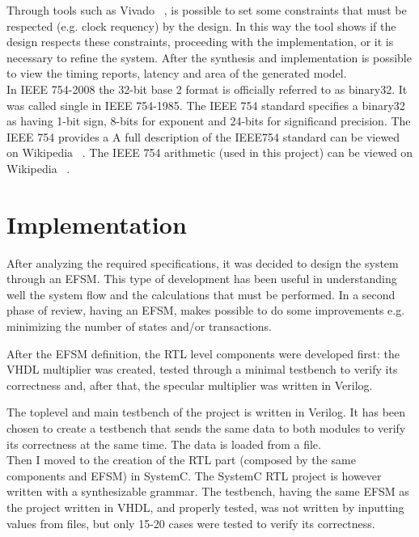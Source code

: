 \documentclass[]{IEEEtran}
\begin{document}
	Through tools such as Vivado ~\cite{vivado}, is possible to set some constraints that must be respected (e.g. clock requency) by the design. In this way the tool shows if the design respects these constraints, proceeding with the implementation, or it is necessary to refine the system.
	After the synthesis and implementation is possible to view the timing reports, latency and area of the generated model.
	\\
	
	In IEEE 754-2008 the 32-bit base 2 format is officially referred to as binary32. It was called single in IEEE 754-1985. The IEEE 754 standard specifies a binary32 as having 1-bit sign, 8-bits for exponent and 24-bits for significand precision. The IEEE 754 provides a A full description of the IEEE754 standard can be viewed on Wikipedia ~\cite{wikiieee754}. The IEEE 754 arithmetic (used in this project) can be viewed on Wikipedia ~\cite{wikiarich754}.
	
	\section{Implementation}
	\label{sec:impl}
		After analyzing the required specifications, it was decided to design the system through an EFSM. This type of development has been useful in understanding well the system flow and the calculations that must be performed. In a second phase of review, having an EFSM, makes possible to do some improvements e.g. minimizing the number of states and/or transactions.
	
	After the EFSM definition, the RTL level components were developed first: the VHDL multiplier was created, tested through a minimal testbench to verify its correctness and, after that, the specular multiplier was written in Verilog.
	
	The toplevel and main testbench of the project is written in Verilog. It has been chosen to create a testbench that sends the same data to both modules to verify its correctness at the same time. The data is loaded from a file.
	\\
	
	Then I moved to the creation of the RTL part (composed by the same components and EFSM) in SystemC. The SystemC RTL project is however written with a synthesizable grammar. The testbench, having the same EFSM as the project written in VHDL, and properly tested, was not written by inputting values from files, but only 15-20 cases were tested to verify its correctness.
	
\end{document}
